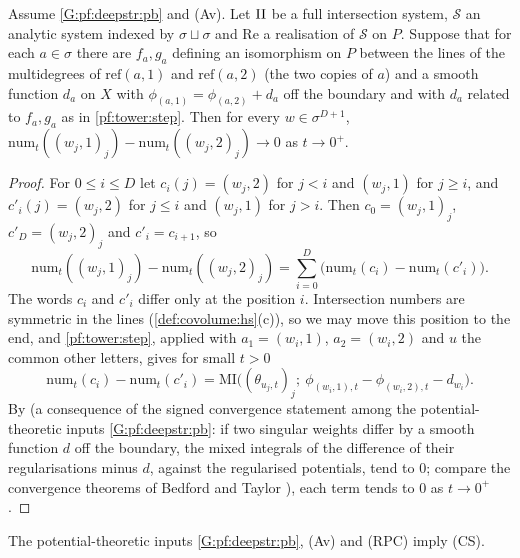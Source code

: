 \begin{proposition}\label{pf:tower:cmpone}
Assume \ref{G:pf:deepstr:pb} and \textup{(Av)}. Let $\mathrm{II}$ be a full intersection system, $\mathcal S$ an analytic system
indexed by $\sigma\sqcup\sigma$ and
$\mathrm{Re}$ a realisation of $\mathcal S$ on $P$. Suppose that for each $a\in\sigma$ there are $f_a,g_a$ defining an
isomorphism on $P$ between the lines of the multidegrees of $\mathrm{ref}(a,1)$ and $\mathrm{ref}(a,2)$ (the two copies of
$a$) and a smooth function $d_a$ on $X$ with $\phi_{(a,1)}=\phi_{(a,2)}+d_a$ off the boundary and with $d_a$ related to
$f_a,g_a$ as in \cref{pf:tower:step}. Then for every $w\in\sigma^{D+1}$,
$\mathrm{num}_t((w_j,1)_j)-\mathrm{num}_t((w_j,2)_j)\to0$ as $t\to0^+$.
\end{proposition}

\begin{proof}
For $0\le i\le D$ let $c_i(j)=(w_j,2)$ for $j<i$ and $(w_j,1)$ for $j\ge i$, and $c'_i(j)=(w_j,2)$ for $j\le i$ and
$(w_j,1)$ for $j>i$. Then $c_0=(w_j,1)_j$, $c'_D=(w_j,2)_j$ and $c'_i=c_{i+1}$, so
\[
\mathrm{num}_t((w_j,1)_j)-\mathrm{num}_t((w_j,2)_j)=\sum_{i=0}^D\bigl(\mathrm{num}_t(c_i)-\mathrm{num}_t(c'_i)\bigr).
\]
The words $c_i$ and $c'_i$ differ only at the position $i$. Intersection numbers are symmetric in the lines
(\cref{def:covolume:hs}(c)), so we may move this position to the end, and
\cref{pf:tower:step}, applied with $a_1=(w_i,1)$, $a_2=(w_i,2)$ and $u$ the common other letters, gives for small $t>0$
\[
\mathrm{num}_t(c_i)-\mathrm{num}_t(c'_i)=\mathrm{MI}\bigl((\theta_{u_j,t})_j;\ \phi_{(w_i,1),t}-\phi_{(w_i,2),t}-d_{w_i}\bigr).
\]
By  (a consequence of the signed convergence statement among
the potential-theoretic inputs \ref{G:pf:deepstr:pb}: if two singular weights differ by a smooth function $d$ off the
boundary, the mixed integrals of the difference of their regularisations minus $d$, against the regularised potentials,
tend to $0$; compare the convergence theorems of Bedford and Taylor \cite{BedfordTaylor1982}), each term tends to $0$ as
$t\to0^+$.
\end{proof}

\begin{theorem}\label{pf:tower:cs}
The potential-theoretic inputs \ref{G:pf:deepstr:pb}, \textup{(Av)} and \textup{(RPC)} imply \textup{(CS)}.
\end{theorem}

